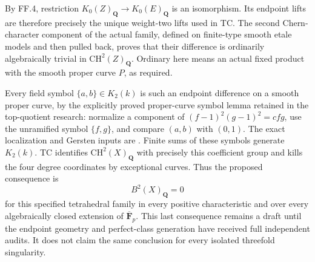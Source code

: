 By FF.4, restriction $K_0(Z)_{\mathbf Q}\to K_0(E)_{\mathbf Q}$
is an isomorphism.  Its endpoint lifts are therefore precisely
the unique weight-two lifts used in TC.  The second Chern-character
component of the actual family, defined on finite-type smooth
etale models and then pulled back, proves that their difference
is ordinarily algebraically trivial in $\mathrm{CH}^2(Z)_{\mathbf Q}$.
Ordinary here means an actual fixed product with the smooth proper
curve $P$, as required.

Every field symbol $\{a,b\}\in K_2(k)$ is such an endpoint
difference on a smooth proper curve, by the explicitly proved
proper-curve symbol lemma retained in the top-quotient research:
normalize a component of $(f-1)^2(g-1)^2=c f g$, use the unramified
symbol $\{f,g\}$, and compare $(a,b)$ with $(0,1)$.
The exact localization and Gersten inputs are
\citet[Section 7, Proposition 3.2 and equation (3.3), p.~127;
Theorem 5.11, pp.~133--134]{rootQuillen1973}.
Finite sums of these symbols generate $K_2(k)$.  TC identifies
$\mathrm{CH}^2(X)_{\mathbf Q}$ with precisely this coefficient
group and kills the four degree coordinates by exceptional curves.
Thus the proposed consequence is
\[
              B^2(X)_{\mathbf Q}=0
\]
for this specified tetrahedral family in every positive
characteristic and over every algebraically closed extension of
$\overline{\mathbf F}_p$.  This last consequence remains a draft
until the endpoint geometry and perfect-class generation have
received full independent audits.  It does not claim the same
conclusion for every isolated threefold singularity.
